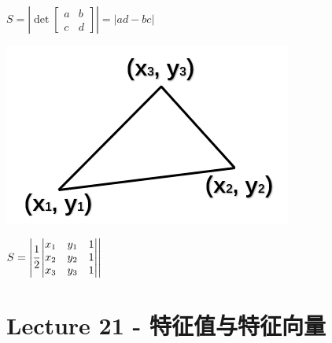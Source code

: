 \documentclass[12pt, a4paper]{article}
\begin{document}
{\begin{center}
\end{center}
\begin{math}
	S = 
	\left|
	\det{
		\begin{bmatrix}
			a & b \\
			c & d 
		\end{bmatrix}
	}
	\right|
	=
	\left|
	ad-bc
	\right|
\end{math}
\begin{center}
	\includegraphics[scale=0.7]{figures/S20-4.png}
\end{center}
\begin{math}
	S = 
	\left|
	\cfrac{1}{2}
	\begin{vmatrix}
		x_1 & y_1 & 1 \\
		x_2 & y_2 & 1 \\
		x_3 & y_3 & 1 
	\end{vmatrix}
	\right|
\end{math}

\newpage
\section{Lecture 21 - 特征值与特征向量}
\pagestyle{fancy}
\lhead{}
\rhead{}

}
\end{document}
